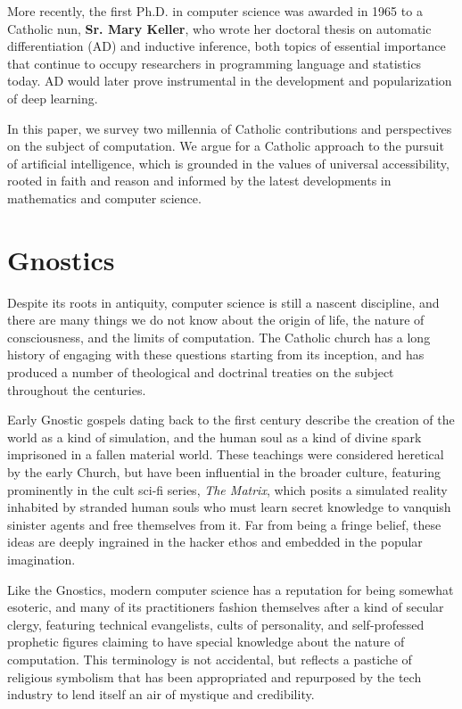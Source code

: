 \documentclass[sigplan,nonacm]{acmart}\settopmatter{printfolios=false,printccs=false,printacmref=false}
\begin{document}
  More recently, the first Ph.D. in computer science was awarded in 1965 to a Catholic nun, \textbf{Sr. Mary Keller}, who wrote her doctoral thesis on automatic differentiation (AD) and inductive inference, both topics of essential importance that continue to occupy researchers in programming language and statistics today. AD would later prove instrumental in the development and popularization of deep learning.

  In this paper, we survey two millennia of Catholic contributions and perspectives on the subject of computation. We argue for a Catholic approach to the pursuit of artificial intelligence, which is grounded in the values of universal accessibility, rooted in faith and reason and informed by the latest developments in mathematics and computer science.

 \section{Gnostics}

  Despite its roots in antiquity, computer science is still a nascent discipline, and there are many things we do not know about the origin of life, the nature of consciousness, and the limits of computation. The Catholic church has a long history of engaging with these questions starting from its inception, and has produced a number of theological and doctrinal treaties on the subject throughout the centuries.

  Early Gnostic gospels dating back to the first century describe the creation of the world as a kind of simulation, and the human soul as a kind of divine spark imprisoned in a fallen material world. These teachings were considered heretical by the early Church, but have been influential in the broader culture, featuring prominently in the cult sci-fi series, \textit{The Matrix}, which posits a simulated reality inhabited by stranded human souls who must learn secret knowledge to vanquish sinister agents and free themselves from it. Far from being a fringe belief, these ideas are deeply ingrained in the hacker ethos and embedded in the popular imagination.

  Like the Gnostics, modern computer science has a reputation for being somewhat esoteric, and many of its practitioners fashion themselves after a kind of secular clergy, featuring technical evangelists, cults of personality, and self-professed prophetic figures claiming to have special knowledge about the nature of computation. This terminology is not accidental, but reflects a pastiche of religious symbolism that has been appropriated and repurposed by the tech industry to lend itself an air of mystique and credibility.
\end{document}
